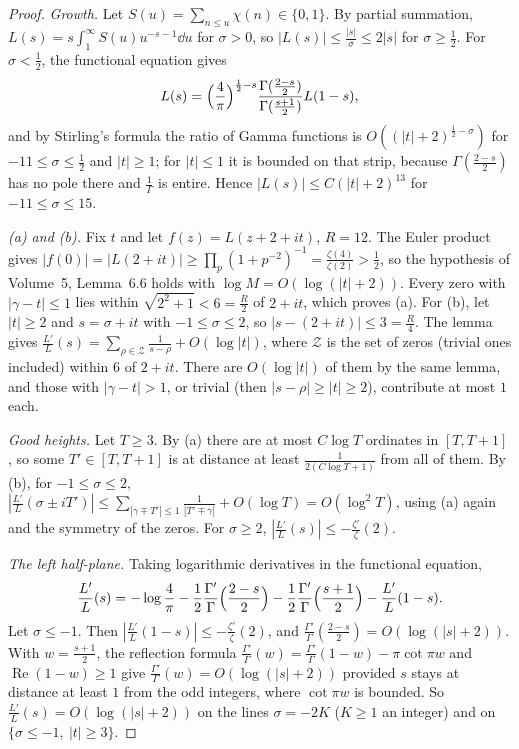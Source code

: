 \begin{proof}
\emph{Growth.} Let $S(u)=\sum_{n\le u}\chi(n)\in\{0,1\}$. By partial summation, $L(s)=s\int_1^\infty S(u)u^{-s-1}\dd u$ for $\sigma>0$, so $|L(s)|\le\frac{|s|}\sigma\le2|s|$ for $\sigma\ge\frac12$. For $\sigma<\frac12$, the functional equation gives
\[
L(s)=\Bigl(\frac4\pi\Bigr)^{\frac12-s}\frac{\Gamma(\frac{2-s}2)}{\Gamma(\frac{s+1}2)}L(1-s),
\]
and by Stirling's formula the ratio of Gamma functions is $O((|t|+2)^{\frac12-\sigma})$ for $-11\le\sigma\le\frac12$ and $|t|\ge1$; for $|t|\le1$ it is bounded on that strip, because $\Gamma(\frac{2-s}2)$ has no pole there and $\frac1\Gamma$ is entire. Hence $|L(s)|\le C(|t|+2)^{13}$ for $-11\le\sigma\le15$.

\emph{(a) and (b).} Fix $t$ and let $f(z)=L(z+2+it)$, $R=12$. The Euler product gives $|f(0)|=|L(2+it)|\ge\prod_p(1+p^{-2})^{-1}=\frac{\zeta(4)}{\zeta(2)}>\frac12$, so the hypothesis of Volume~5, Lemma~6.6 holds with $\log M=O(\log(|t|+2))$. Every zero with $|\gamma-t|\le1$ lies within $\sqrt{2^2+1}<6=\frac R2$ of $2+it$, which proves (a). For (b), let $|t|\ge2$ and $s=\sigma+it$ with $-1\le\sigma\le2$, so $|s-(2+it)|\le3=\frac R4$. The lemma gives $\frac{L'}L(s)=\sum_{\rho\in\mathcal Z}\frac1{s-\rho}+O(\log|t|)$, where $\mathcal Z$ is the set of zeros (trivial ones included) within $6$ of $2+it$. There are $O(\log|t|)$ of them by the same lemma, and those with $|\gamma-t|>1$, or trivial (then $|s-\rho|\ge|t|\ge2$), contribute at most $1$ each.

\emph{Good heights.} Let $T\ge3$. By (a) there are at most $C\log T$ ordinates in $[T,T+1]$, so some $T'\in[T,T+1]$ is at distance at least $\frac1{2(C\log T+1)}$ from all of them. By (b), for $-1\le\sigma\le2$, $|\frac{L'}L(\sigma\pm iT')|\le\sum_{|\gamma\mp T'|\le1}\frac1{|T'\mp\gamma|}+O(\log T)=O(\log^2T)$, using (a) again and the symmetry of the zeros. For $\sigma\ge2$, $|\frac{L'}L(s)|\le-\frac{\zeta'}\zeta(2)$.

\emph{The left half-plane.} Taking logarithmic derivatives in the functional equation,
\[
\frac{L'}L(s)=-\log\frac4\pi-\frac12\frac{\Gamma'}\Gamma\Bigl(\frac{2-s}2\Bigr)-\frac12\frac{\Gamma'}\Gamma\Bigl(\frac{s+1}2\Bigr)-\frac{L'}L(1-s).
\]
Let $\sigma\le-1$. Then $|\frac{L'}L(1-s)|\le-\frac{\zeta'}\zeta(2)$, and $\frac{\Gamma'}\Gamma(\frac{2-s}2)=O(\log(|s|+2))$. With $w=\frac{s+1}2$, the reflection formula $\frac{\Gamma'}\Gamma(w)=\frac{\Gamma'}\Gamma(1-w)-\pi\cot\pi w$ and $\operatorname{Re}(1-w)\ge1$ give $\frac{\Gamma'}\Gamma(w)=O(\log(|s|+2))$ provided $s$ stays at distance at least $1$ from the odd integers, where $\cot\pi w$ is bounded. So $\frac{L'}L(s)=O(\log(|s|+2))$ on the lines $\sigma=-2K$ ($K\ge1$ an integer) and on $\{\sigma\le-1,\ |t|\ge3\}$.


\end{proof}
